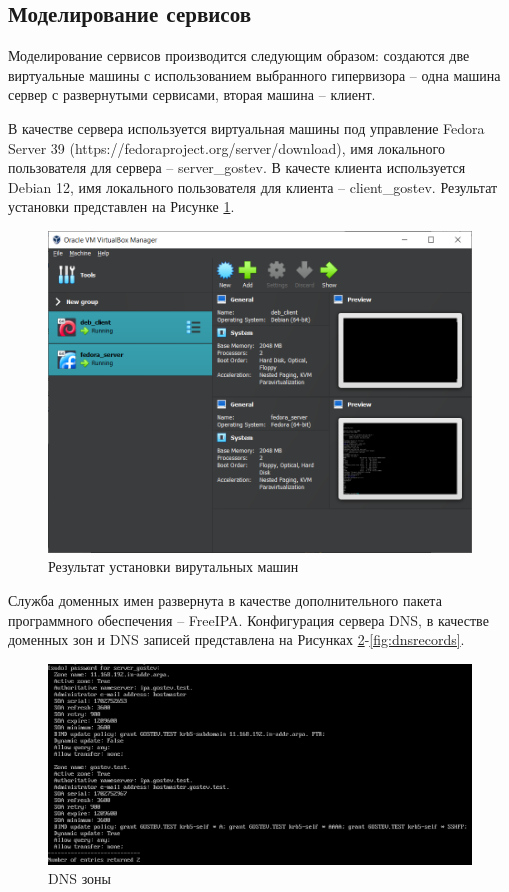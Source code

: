 \documentclass[14pt, a4paper]{extarticle}
\numberwithin{equation}{section}
\begin{document}
\subsection{Моделирование сервисов}
Моделирование сервисов производится следующим образом: 
создаются две виртуальные машины с использованием выбранного гипервизора – 
одна машина сервер с развернутыми сервисами, вторая машина – клиент.

В качестве сервера используется виртуальная машины под управление Fedora Server 39 \cite{}(https://fedoraproject.org/server/download), 
имя локального пользователя для сервера -- server\_gostev.
В качесте клиента используется Debian 12, имя локального пользователя для клиента -- client\_gostev. 
Результат установки представлен на Рисунке \ref{fig:vm_installation}.

\begin{figure}[H]
        \centering
        \includegraphics[scale=0.6]{vm_installation.png}
        \caption{Результат установки вирутальных машин}
        \label{fig:vm_installation}
\end{figure}




Служба доменных имен развернута в качестве дополнительного пакета программного обеспечения -- FreeIPA.
Конфигурация сервера DNS, в качестве доменных зон и DNS записей представлена на Рисунках \ref{fig:dnszones}-\ref{fig:dnsrecords}. 

\begin{figure}[H]
        \centering
        \includegraphics[scale=0.7]{services/dns/dnszones.png}
        \caption{DNS зоны}
        \label{fig:dnszones}
\end{figure}
\end{document}
